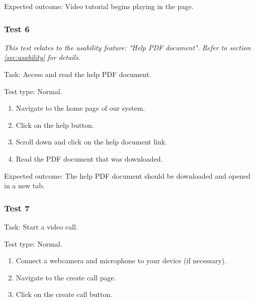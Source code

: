 {\sffamily Expected outcome:} Video tutorial begins playing in
the page.

{\color{gray} \hrulefill}

\vspace{0.2cm}

\subsubsection{Test 6}

\textit{This test relates to the usability feature:
"Help PDF document". Refer to section
\ref{sec:usability} for details.} \\ \vspace{0.2cm}

{\sffamily Task:} Access and read the help PDF document.\\

{\color{gray} \hrulefill}

{\sffamily Test type: Normal.}\\

\begin{enumerate}
  \item Navigate to the home page of our system.
  \item Click on the help button.
  \item Scroll down and click on the help document link.
  \item Read the PDF document that was downloaded.
\end{enumerate}

{\sffamily Expected outcome:} The help PDF document should
be downloaded and opened in a new tab. \\

{\color{gray} \hrulefill}

\vspace{0.2cm}


\subsubsection{Test 7}

{\sffamily Task:} Start a video call.\\

{\color{gray} \hrulefill}

{\sffamily Test type: Normal.}\\

\begin{enumerate}
  \item Connect a webcamera and microphone to your device (if necessary).
  \item Navigate to the create call page.
  \item Click on the create call button.
\end{enumerate}

